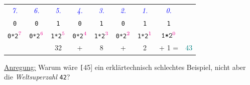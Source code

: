\begin{frame}[fragile]
\begin{footnotesize}
  \renewcommand{\arraystretch}{1.5}
    \begin{tabular}{c c c c c c c c c}
    \textit{\textcolor{blue}{7.}} &\textit{\textcolor{blue}{6.}} &
      \textit{\textcolor{blue}{5.}} & \textit{\textcolor{blue}{4.}} &
        \textit{\textcolor{blue}{3.}} & \textit{\textcolor{blue}{2.}} &
          \textit{\textcolor{blue}{1.}} & \textit{\textcolor{blue}{0.}} & \\
      \texttt{0} & \texttt{0} & \texttt{1} & \texttt{0} & \texttt{1} & \texttt{0} & \texttt{1} & \texttt{1} & \\
      \texttt{0*2}$\mathcolor{magenta}{^7}$ & \texttt{0*2}$\mathcolor{magenta}{^6}$ & 
        \texttt{1*2}$\mathcolor{magenta}{^5}$ & \texttt{0*2}$\mathcolor{magenta}{^4}$ & 
         \texttt{1*2}$\mathcolor{magenta}{^3}$ & \texttt{0*2}$\mathcolor{magenta}{^2}$ & 
           \texttt{1*2}$\mathcolor{magenta}{^1}$ & $\texttt{1*2}\mathcolor{magenta}{^0}$ & \\
      & & 32 & + & 8 & + & 2 & + 1 = & \textcolor{teal}{43} \\
   \end{tabular}
  \end{footnotesize}

  \vspace{0.4cm}
  \tiny{\underline{Anregung:} Warum wäre \texttt[45] ein erklärtechnisch schlechtes Beispiel, nicht aber die \textit{Weltsuperzahl} \texttt{42}?}
\end{frame}


